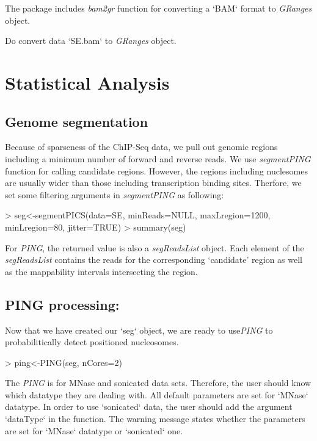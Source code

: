 \documentclass[12pt]{article}
\newcommand{\Rfunction}[1]{{\textit{#1}}}
\newcommand{\Rclass}[1]{{\textit{#1}}}
\begin{document}
The  package includes \Rfunction{bam2gr} function for converting a `BAM` format to \Rclass{GRanges} object.

\begin{Exercise}
Do convert data `SE.bam` to \Rclass{GRanges} object. 
\end{Exercise} 


\section{Statistical Analysis}
\subsection{Genome segmentation}
Because of sparseness of the ChIP-Seq data, we pull out genomic regions including a minimum number of forward and reverse reads. We use \Rfunction{segmentPING} function for calling candidate regions. However, the regions including nuclesomes are usually wider than those including transcription binding sites. Therfore, we set some filtering arguments in \Rfunction{segmentPING} as following:

\begin{Schunk}
\begin{Sinput}
> seg<-segmentPICS(data=SE, minReads=NULL, maxLregion=1200, minLregion=80, jitter=TRUE)
> summary(seg)
\end{Sinput}
\end{Schunk}

For \Rclass{PING}, the returned value is also a \Rclass{segReadsList} object. Each element of the \Rclass{segReadsList} contains the reads for the corresponding `candidate' region as well as the mappability intervals intersecting the region.


\subsection{PING processing:}
Now that we have created our `seg` object, we are ready to use\Rfunction{PING} to probabilitically detect positioned nucleosomes.  

\begin{Schunk}
\begin{Sinput}
> ping<-PING(seg, nCores=2)
\end{Sinput}
\end{Schunk}

The \Rclass{PING} is for MNase and sonicated data sets. Therefore, the user should know which datatype they are dealing with. All default parameters are set for `MNase` datatype. In order to use `sonicated` data, the user should add the argument `dataType` in the function. The warning message states whether the parameters are set for `MNase` datatype or `sonicated` one.
\end{document}

